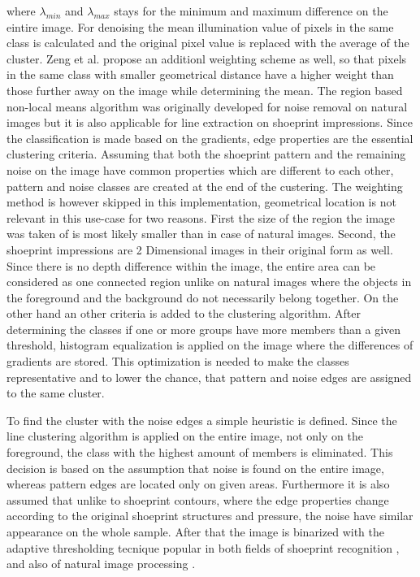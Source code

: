 \documentclass[draft,final]{vutinfth} %
\begin{document}
where $\lambda_{min}$ and $\lambda_{max}$ stays for the minimum and maximum difference on the eintire image.
For denoising the mean illumination value of pixels in the same class is calculated and the original pixel value is replaced with the average of the cluster.
Zeng et al. \cite{zeng2011region} propose an additionl weighting scheme as well, so that pixels in the same class with smaller geometrical distance have a higher weight than those further away on the image while determining the mean.
The region based non-local means algorithm was originally developed for noise removal on natural images but it is also applicable for line extraction on shoeprint impressions.
Since the classification is made based on the gradients, edge properties are the essential clustering criteria.
Assuming that both the shoeprint pattern and the remaining noise on the image have common properties which are different to each other, pattern and noise classes are created at the end of the custering.
The weighting method is however skipped in this implementation, geometrical location is not relevant in this use-case for two reasons.
First the size of the region the image was taken of is most likely smaller than in case of natural images.
Second, the shoeprint impressions are 2 Dimensional images in their original form as well. 
Since there is no depth difference within the image, the entire area can be considered as one connected region unlike on natural images where the objects in the foreground and the background do not necessarily belong together.
On the other hand an other criteria is added to the clustering algorithm.
After determining the classes if one or more groups have more members than a given threshold, histogram equalization is applied on the image where the differences of gradients are stored.
This optimization is needed to make the classes representative and to lower the chance, that pattern and noise edges are assigned to the same cluster. 
\par
To find  the cluster with the noise edges a simple heuristic is defined.
Since the line clustering algorithm is applied on the entire image, not only on the foreground, the class with the highest amount of members is eliminated.
This decision is based on the assumption that noise is found on the entire image, whereas pattern edges are located only on given areas.
Furthermore it is also assumed that unlike to shoeprint contours, where the edge properties change according to the original shoeprint structures and pressure, the noise have similar appearance on the whole sample.
After that the image is binarized with the adaptive thresholding tecnique \cite{laine1996multiscale} popular in both fields of shoeprint recognition  \cite{wang2014automatic}, \cite{li2014retrieval} and also of natural image processing \cite{xu2016image}.
\end{document}
